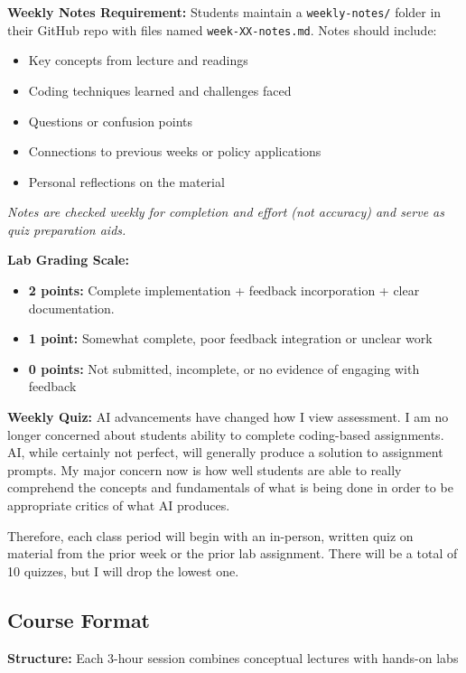 \documentclass[
  11pt,
]{article}
\providecommand{\tightlist}{%
  \setlength{\itemsep}{0pt}\setlength{\parskip}{0pt}}
\begin{document}
\textbf{Weekly Notes Requirement:} Students maintain a
\texttt{weekly-notes/} folder in their GitHub repo with files named
\texttt{week-XX-notes.md}. Notes should include:

\begin{itemize}
\tightlist
\item
  Key concepts from lecture and readings
\item
  Coding techniques learned and challenges faced
\item
  Questions or confusion points
\item
  Connections to previous weeks or policy applications
\item
  Personal reflections on the material
\end{itemize}

\emph{Notes are checked weekly for completion and effort (not accuracy)
and serve as quiz preparation aids.}

\textbf{Lab Grading Scale:}

\begin{itemize}
\tightlist
\item
  \textbf{2 points:} Complete implementation + feedback incorporation +
  clear documentation.
\item
  \textbf{1 point:} Somewhat complete, poor feedback integration or
  unclear work
\item
  \textbf{0 points:} Not submitted, incomplete, or no evidence of
  engaging with feedback
\end{itemize}

\textbf{Weekly Quiz:} AI advancements have changed how I view
assessment. I am no longer concerned about students ability to complete
coding-based assignments. AI, while certainly not perfect, will
generally produce a solution to assignment prompts. My major concern now
is how well students are able to really comprehend the concepts and
fundamentals of what is being done in order to be appropriate critics of
what AI produces.

Therefore, each class period will begin with an in-person, written quiz
on material from the prior week or the prior lab assignment. There will
be a total of 10 quizzes, but I will drop the lowest one.

\subsection{Course Format}\label{course-format}

\textbf{Structure:} Each 3-hour session combines conceptual lectures
with hands-on labs
\end{document}
